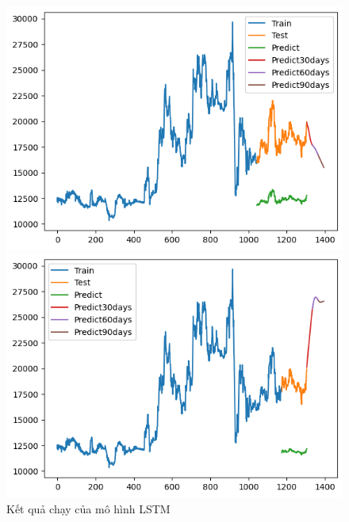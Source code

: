 \begin{figure}[H]
\begin{minipage}{0.15\textwidth}
    \end{minipage}
    \hfill
    \begin{minipage}{0.15\textwidth}
    \centering
    \includegraphics[width=1\textwidth]{resources/chapter-5/newdata1/result/EIB_ LSTM_8-2.png}
    \end{minipage}
    \hfill
        \begin{minipage}{0.15\textwidth}
    \centering
    \includegraphics[width=1\textwidth]{resources/chapter-5/newdata1/result/EIB_ LSTM_9-1.png}
    \end{minipage}
    \hfill
    
    \caption{Kết quả chạy của mô hình LSTM}
    \label{fig:lstm_result}
\end{figure}

